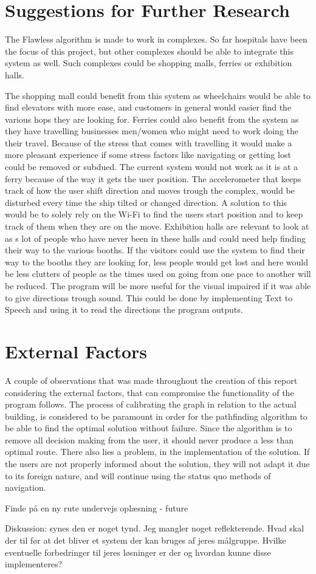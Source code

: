 \section{Suggestions for Further Research}

The Flawless algorithm is made to work in complexes. So far hospitals have been the focus of this project, but other complexes should be able to integrate this system as well. Such complexes could be shopping malls, ferries or exhibition halls. 

The shopping mall could benefit from this system as wheelchairs would be able to find elevators with more ease, and customers in general would easier find the various hops they are looking for. Ferries could also benefit from the system as they have travelling businesses men/women who might need to work doing the their travel. Because of the stress that comes with travelling\cite{future_stress} it would make a more pleasant experience if some stress factors like navigating or getting lost could be removed or subdued. The current system would not work as it is at a ferry because of the way it gets the user position. The accelerometer that keeps track of how the user shift direction and moves trough the complex, would be disturbed every time the ship tilted or changed direction. A solution to this would be to solely rely on the Wi-Fi to find the users start position and to keep track of them when they are on the move. Exhibition halls are relevant to look at as s lot of people who have never been in these halls and could need help finding their way to the various booths. If the visitors could use the system to find their way to the booths they are looking for, less people would get lost and here would be less clutters of people as the times used on going from one pace to another will be reduced. 
\newline 
The program will be more useful for the visual impaired if it was able to give directions trough sound. This could be done by implementing Text to Speech\cite{diss_tss} and using it to read the directions the program outputs.

\section{External Factors}

A couple of observations that was made throughout the creation of this report considering the external factors, that can compromise the functionality of the program follows. The process of calibrating the graph in relation to the actual building, is considered to be paramount in order for the pathfinding algorithm to be able to find the optimal solution without failure. Since the algorithm is to remove all decision making from the user, it should never produce a less than optimal route. There also lies a problem, in the implementation of the solution. If the users are not properly informed about the solution, they will not adapt it due to its foreign nature, and will continue using the status quo methods of navigation.



Finde på en ny rute undervejs
oplæsning - future

Diskussion: synes den er noget tynd. Jeg mangler noget reflekterende. Hvad skal der til før at det bliver et system der kan bruges af jeres målgruppe. Hvilke eventuelle forbedringer til jeres løsninger er der og hvordan kunne disse implementeres?